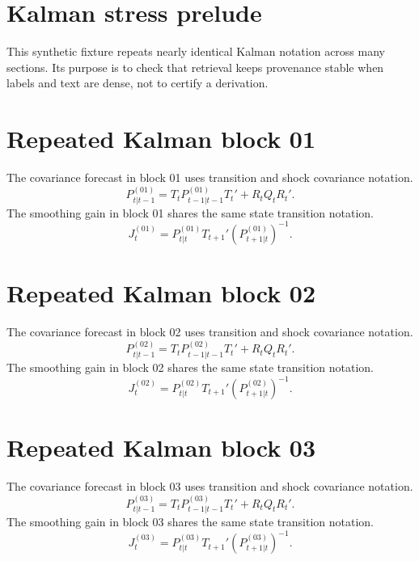 \section{Kalman stress prelude}
This synthetic fixture repeats nearly identical Kalman notation across many sections. Its purpose is to check that retrieval keeps provenance stable when labels and text are dense, not to certify a derivation.

\section{Repeated Kalman block 01}
The covariance forecast in block 01 uses transition and shock covariance notation.
\begin{equation}\label{eq:repeat-kalman-covariance-01}
P^{(01)}_{t|t-1} = T_t P^{(01)}_{t-1|t-1}T_t' + R_t Q_t R_t'.
\end{equation}
The smoothing gain in block 01 shares the same state transition notation.
\begin{equation}\label{eq:repeat-kalman-smoothing-01}
J^{(01)}_t = P^{(01)}_{t|t}T_{t+1}'(P^{(01)}_{t+1|t})^{-1}.
\end{equation}

\section{Repeated Kalman block 02}
The covariance forecast in block 02 uses transition and shock covariance notation.
\begin{equation}\label{eq:repeat-kalman-covariance-02}
P^{(02)}_{t|t-1} = T_t P^{(02)}_{t-1|t-1}T_t' + R_t Q_t R_t'.
\end{equation}
The smoothing gain in block 02 shares the same state transition notation.
\begin{equation}\label{eq:repeat-kalman-smoothing-02}
J^{(02)}_t = P^{(02)}_{t|t}T_{t+1}'(P^{(02)}_{t+1|t})^{-1}.
\end{equation}

\section{Repeated Kalman block 03}
The covariance forecast in block 03 uses transition and shock covariance notation.
\begin{equation}\label{eq:repeat-kalman-covariance-03}
P^{(03)}_{t|t-1} = T_t P^{(03)}_{t-1|t-1}T_t' + R_t Q_t R_t'.
\end{equation}
The smoothing gain in block 03 shares the same state transition notation.
\begin{equation}\label{eq:repeat-kalman-smoothing-03}
J^{(03)}_t = P^{(03)}_{t|t}T_{t+1}'(P^{(03)}_{t+1|t})^{-1}.
\end{equation}

